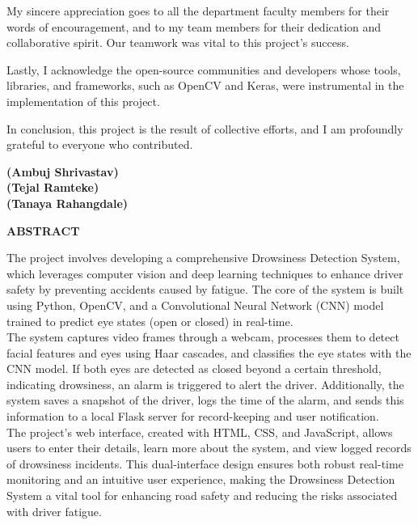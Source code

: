 \documentclass[12pt]{article}
\begin{document}
My sincere appreciation goes to all the department faculty members for their words of encouragement, and to my team members for their dedication and collaborative spirit. Our teamwork was vital to this project's success.

Lastly, I acknowledge the open-source communities and developers whose tools, libraries, and frameworks, such as OpenCV and Keras, were instrumental in the implementation of this project.

In conclusion, this project is the result of collective efforts, and I am profoundly grateful to everyone who contributed.\\

 \begin{flushright}
\normalsize\textbf {(Ambuj Shrivastav)\\
(Tejal Ramteke)\\
(Tanaya Rahangdale)}
\end{flushright} 
\newpage
\begin{center}
\Large
\textbf{ABSTRACT}\\
\vspace{1cm}
\end{center}
The project involves developing a comprehensive Drowsiness Detection System, which leverages computer vision and deep learning techniques to enhance driver safety by preventing accidents caused by fatigue. The core of the system is built using Python, OpenCV, and a Convolutional Neural Network (CNN) model trained to predict eye states (open or closed) in real-time.\\

 The system captures video frames through a webcam, processes them to detect facial features and eyes using Haar cascades, and classifies the eye states with the CNN model. If both eyes are detected as closed beyond a certain threshold, indicating drowsiness, an alarm is triggered to alert the driver. Additionally, the system saves a snapshot of the driver, logs the time of the alarm, and sends this information to a local Flask server for record-keeping and user notification.\\

 The project's web interface, created with HTML, CSS, and JavaScript, allows users to enter their details, learn more about the system, and view logged records of drowsiness incidents. This dual-interface design ensures both robust real-time monitoring and an intuitive user experience, making the Drowsiness Detection System a vital tool for enhancing road safety and reducing the risks associated with driver fatigue.
\vspace{1cm}
\end{document}
